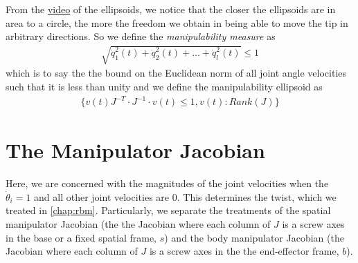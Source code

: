 From the \href{http://scriptedonachip.com/downloads/Videos/manipulability.mp4}{video} of the ellipsoids, we notice that the closer the ellipsoids are in area to a circle, the more the freedom we obtain in being able to move the tip in arbitrary directions.  So we define the \textit{manipulability measure} as 
%
\begin{align}
	\sqrt{\dot{q}_1^2(t)+\dot{q}_2^2(t)+\ldots + \dot{q}_l^2(t)} \le 1
\end{align}
%
which is to say the the bound on the Euclidean norm of all joint angle velocities such that it is less than unity and we define the manipulability ellipsoid as 
%
\begin{align}
	\{ v(t) J^{-T} \cdot J^{-1} \cdot v(t) \le 1, v(t): Rank(J) \}
 \end{align}

\section{The Manipulator Jacobian}

Here, we are concerned with the magnitudes of the joint velocities when the  $\dot{\theta}_i = 1$ and all other joint velocities are $0$. This determines the twist, which we treated in \autoref{chap:rbm}. Particularly, we separate the treatments of the spatial manipulator Jacobian (\ie the the Jacobian where each column of $J$ is a screw axes in the base or a fixed spatial frame, $s$) and the body manipulator Jacobian (\ie the Jacobian where each column of $J$ is a screw axes in the the end-effector frame, $b$).

